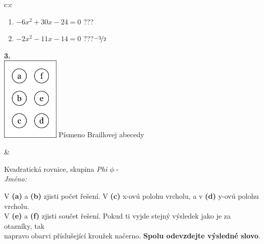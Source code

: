 \documentclass[10pt]{report}
\begin{document}
\begin{tabular}{c:c}
\begin{minipage}[c][104.5mm][t]{0.5\linewidth}
\begin{center}
\begin{minipage}{0.79\linewidth}
\begin{center}
\begin{varwidth}{\linewidth}
\begin{enumerate}
\item $-6x^2+30x-24=0$\quad \dotfill\; ???\;\dotfill {}
\item $-2x^2-11x-14=0$\quad \dotfill\; ???\;\dotfill \quad $\nicefrac{-3}{2}$
\end{enumerate}
\end{varwidth}
\end{center}
\end{minipage}
\begin{minipage}{0.20\linewidth}
\begin{center}
{\Huge\bfseries 3.} \\[2mm]
\includegraphics[height=40mm]{../images/braille.png}
{\small Písmeno Braillovej abecedy}
\end{center}
\end{minipage}
\end{center}
\end{minipage}
&
\begin{minipage}[c][104.5mm][t]{0.5\linewidth}
\begin{center}
\vspace{7mm}
{\huge Kvadratická rovnice, skupina \textit{Phi $\phi$} -}\\[5mm]
\textit{Jméno:}\phantom{xxxxxxxxxxxxxxxxxxxxxxxxxxxxxxxxxxxxxxxxxxxxxxxxxxxxxxxxxxxxxxxxx}\\[5mm]
\begin{minipage}{0.95\linewidth}
\begin{center}
V \textbf{(a)} a \textbf{(b)} zjisti počet řešení. V \textbf{(c)} x-ovú polohu vrcholu, a v \textbf{(d)} y-ovú polohu vrcholu.\\V \textbf{(e)} a \textbf{(f)} zjisti součet řešení. Pokud ti vyjde stejný výsledek jako je za otazníky, tak\\napravo obarvi příslušející kroužek načerno. \textbf{Spolu odevzdejte výsledné slovo}.
\end{center}
\end{minipage}
\\[1mm]
\begin{minipage}{0.79\linewidth}
\begin{center}

\end{center}
\end{minipage}
\end{center}
\end{minipage}
\end{tabular}
\end{document}
